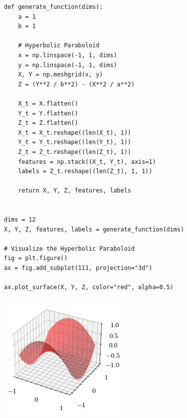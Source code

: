 \documentclass[openany]{book}
\begin{document}
\begin{tcolorbox}
\tiny
\begin{verbatim}
def generate_function(dims):
    a = 1
    b = 1

    # Hyperbolic Paraboloid
    x = np.linspace(-1, 1, dims)
    y = np.linspace(-1, 1, dims)
    X, Y = np.meshgrid(x, y)
    Z = (Y**2 / b**2) - (X**2 / a**2)

    X_t = X.flatten()
    Y_t = Y.flatten()
    Z_t = Z.flatten()
    X_t = X_t.reshape((len(X_t), 1))
    Y_t = Y_t.reshape((len(Y_t), 1))
    Z_t = Z_t.reshape((len(Z_t), 1))
    features = np.stack((X_t, Y_t), axis=1)
    labels = Z_t.reshape((len(Z_t), 1, 1))

    return X, Y, Z, features, labels


dims = 12
X, Y, Z, features, labels = generate_function(dims)

# Visualize the Hyperbolic Paraboloid
fig = plt.figure()
ax = fig.add_subplot(111, projection="3d")

ax.plot_surface(X, Y, Z, color="red", alpha=0.5)
\end{verbatim}
\end{tcolorbox}
        
    \begin{center}
    \includegraphics[width=\textwidth]{combined_files/combined_151_1.png}
    \end{center}
    { \hspace*{\fill} \\}
    
\end{document}
